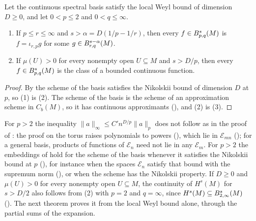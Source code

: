 \begin{theorem}
\label{thm:local-weyl-embedding}
\leanok
{}
Let the continuous spectral basis satisfy the local Weyl bound of dimension $D \geq 0$, and let
$0 < p \leq 2$ and $0 < q \leq \infty$.
\begin{enumerate}
  \item If $p \leq r \leq \infty$ and $s > \alpha = D(1/p - 1/r)$, then every
    $f \in B^{s}_{p,q}(M)$ is $f = \iota_{r,p} g$ for some $g \in B^{s - \alpha}_{r,q}(M)$.
  \item If $\mu(U) > 0$ for every nonempty open $U \subseteq M$ and $s > D/p$, then every
    $f \in B^{s}_{p,q}(M)$ is the class of a bounded continuous function.
\end{enumerate}
\end{theorem}

\begin{proof}
\leanok
{}
By  the scheme of the basis satisfies the Nikolskii bound of
dimension $D$ at $p$, so (1) is (2). The scheme of the basis is the
scheme of an approximation scheme in $C_b(M)$, so it has continuous approximants
(), and (2) is (3).
\end{proof}

For $p > 2$ the inequality $\|a\|_\infty \leq C' n^{D/p} \|a\|_p$ does not follow as in the proof
of :
the proof on the torus raises polynomials to powers (), which lie in
$\mathcal{E}_{mn}$ (); for a general basis, products of functions of
$\mathcal{E}_n$ need not lie in any $\mathcal{E}_m$. For $p > 2$ the embeddings of
 hold for the scheme of the basis whenever it satisfies the Nikolskii
bound at $p$ (), for instance when the spaces $\mathcal{E}_n$
satisfy that bound with the supremum norm (), or when the
scheme has the Nikolskii property.
If $D \geq 0$ and $\mu(U) > 0$ for every nonempty open $U \subseteq M$, the continuity of
$H^s(M)$ for $s > D/2$ also follows from (2) with $p = 2$ and
$q = \infty$,
since $H^s(M) \subseteq B^{s}_{2,\infty}(M)$ ().
The next theorem proves it from the local Weyl bound alone, through the partial sums of the
expansion.

